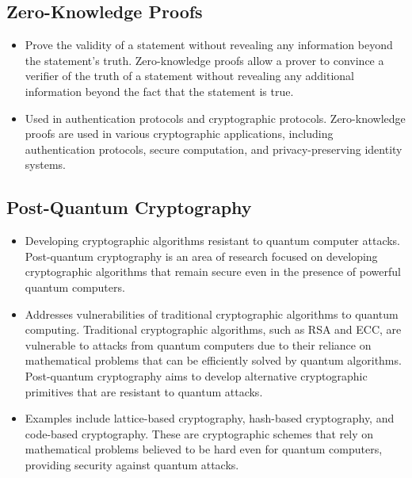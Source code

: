 \documentclass[11pt]{article}
\begin{document}
\subsection{Zero-Knowledge Proofs}
\begin{itemize}
    \item Prove the validity of a statement without revealing any information beyond the statement’s truth. Zero-knowledge proofs allow a prover to convince a verifier of the truth of a statement without revealing any additional information beyond the fact that the statement is true.
    \item Used in authentication protocols and cryptographic protocols. Zero-knowledge proofs are used in various cryptographic applications, including authentication protocols, secure computation, and privacy-preserving identity systems.
\end{itemize}

\subsection{Post-Quantum Cryptography}
\begin{itemize}
    \item Developing cryptographic algorithms resistant to quantum computer attacks. Post-quantum cryptography is an area of research focused on developing cryptographic algorithms that remain secure even in the presence of powerful quantum computers.
    \item Addresses vulnerabilities of traditional cryptographic algorithms to quantum computing. Traditional cryptographic algorithms, such as RSA and ECC, are vulnerable to attacks from quantum computers due to their reliance on mathematical problems that can be efficiently solved by quantum algorithms. Post-quantum cryptography aims to develop alternative cryptographic primitives that are resistant to quantum attacks.
    \item Examples include lattice-based cryptography, hash-based cryptography, and code-based cryptography. These are cryptographic schemes that rely on mathematical problems believed to be hard even for quantum computers, providing security against quantum attacks.
\end{itemize}
\end{document}
